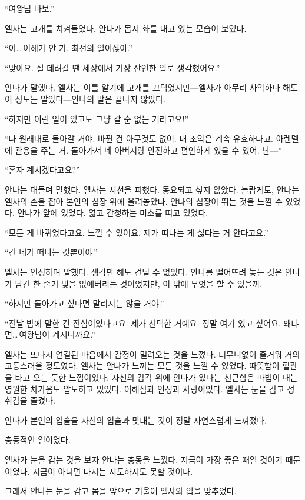 ``여왕님 바보.''

엘사는 고개를 치켜들었다. 안나가 몹시 화를 내고 있는 모습이 보였다.

``이\ldots\,이해가 안 가. 최선의 일이잖아.''

``맞아요. 절 데려갈 땐 세상에서 가장 잔인한 일로 생각했어요.''

안나가 말했다. 엘사는 이를 알기에 고개를 끄덕였지만—엘사가 아무리 사악하다 해도 이 정도는 알았다—안나의 말은 끝나지 않았다.

``하지만 이런 일이 있고도 그냥 갈 순 없는 거라고요!''

``다 원래대로 돌아갈 거야. 바뀐 건 아무것도 없어. 내 조약은 계속 유효하다고. 아렌델에 관용을 주는 거. 돌아가서 네 아버지랑 안전하고 편안하게 있을 수 있어. 난—''

``혼자 계시겠다고요?''

안나는 대들며 말했다. 엘사는 시선을 피했다. 동요되고 싶지 않았다. 놀랍게도, 안나는 엘사의 손을 잡아 본인의 심장 위에 올려놓았다. 안나의 심장이 뛰는 것을 느낄 수 있었다. 안나가 앞에 있었다. 엷고 간청하는 미소를 띠고 있었다.

``모든 게 바뀌었다고요. 느낄 수 있어요. 제가 떠나는 게 싫다는 거 안다고요.''

`` 건 네가 떠나는 것뿐이야.''

엘사는 인정하며 말했다. 생각만 해도 견딜 수 없었다. 안나를 떨어뜨려 놓는 것은 안나가 남긴 한 줄기 빛을 없애버리는 것이었지만, 이 밖에 무엇을 할 수 있을까.

``하지만 돌아가고 싶다면 말리지는 않을 거야.''

``전날 밤에 말한 건 진심이었다고요. 제가 선택한 거예요. 정말 여기 있고 싶어요. 왜냐면\ldots\,여왕님이 계시니까요.''

엘사는 또다시 연결된 마음에서 감정이 밀려오는 것을 느꼈다. 터무니없이 즐거워 거의 고통스러울 정도였다. 엘사는 안나가 느끼는 모든 것을 느낄 수 있었다. 따뜻함이 혈관을 타고 오는 듯한 느낌이었다. 자신의 감각 위에 안나가 있다는 친근함은 마법이 내는 영원한 차가움도 압도하고 있었다. 이해심과 인정과 사랑이었다. 엘사는 눈을 감고 성취감을 즐겼다.

안나가 본인의 입술을 자신의 입술과 맞대는 것이 정말 자연스럽게 느껴졌다.

\textbreak

충동적인 일이었다.

엘사가 눈을 감는 것을 보자 안나는 충동을 느꼈다. 지금이 가장 좋은 때일 것이기 때문이었다. 지금이 아니면 다시는 시도하지도 못할 것이다.

그래서 안나는 눈을 감고 몸을 앞으로 기울여 엘사와 입을 맞추었다.

